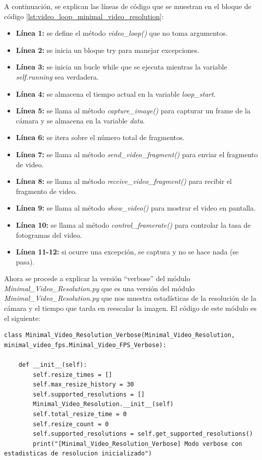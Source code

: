 A continuación, se explican las líneas de código que se muestran en el bloque de código \ref{lst:video_loop_minimal_video_resolution}:
\begin{itemize}
    \item \textbf{Línea 1:} se define el método \textit{video\_loop()} que no toma argumentos.
    \item \textbf{Línea 2:} se inicia un bloque try para manejar excepciones.
    \item \textbf{Línea 3:} se inicia un bucle while que se ejecuta mientras la variable \textit{self.running} sea verdadera.
    \item \textbf{Línea 4:} se almacena el tiempo actual en la variable \textit{loop\_start}.
    \item \textbf{Línea 5:} se llama al método \textit{capture\_image()} para capturar un frame de la cámara y se almacena en la variable \textit{data}.
    \item \textbf{Línea 6:} se itera sobre el número total de fragmentos.
    \item \textbf{Línea 7:} se llama al método \textit{send\_video\_fragment()} para enviar el fragmento de video.
    \item \textbf{Línea 8:} se llama al método \textit{receive\_video\_fragment()} para recibir el fragmento de video.
    \item \textbf{Línea 9:} se llama al método \textit{show\_video()} para mostrar el video en pantalla.
    \item \textbf{Línea 10:} se llama al método \textit{control\_framerate()} para controlar la tasa de fotogramas del video.
    \item \textbf{Línea 11-12:} si ocurre una excepción, se captura y no se hace nada (se pasa).
\end{itemize}
\vspace{\baselineskip}

Ahora se procede a explicar la versión ``verbose'' del módulo \textit{Minimal\_Video\_Resolution.py} que es una versión del módulo \textit{Minimal\_Video\_Resolution.py} que nos muestra estadísticas de la resolución de la cámara y el tiempo que tarda en reescalar la imagen. El código de este módulo es el siguiente:
\begin{lstlisting}[style=pythonstyle, caption={Comienzo del módulo \textit{Minimal\_Video\_Resolution\_verbose} y su inicialización}, label={lst:comienzo_minimal_video_resolution_verbose}]
class Minimal_Video_Resolution_Verbose(Minimal_Video_Resolution, minimal_video_fps.Minimal_Video_FPS_Verbose):
    
    def __init__(self):
        self.resize_times = []
        self.max_resize_history = 30
        self.supported_resolutions = []
        Minimal_Video_Resolution.__init__(self)
        self.total_resize_time = 0
        self.resize_count = 0
        self.supported_resolutions = self.get_supported_resolutions()
        print("[Minimal_Video_Resolution_Verbose] Modo verbose con estadisticas de resolucion inicializado")
\end{lstlisting}
\vspace{\baselineskip}

